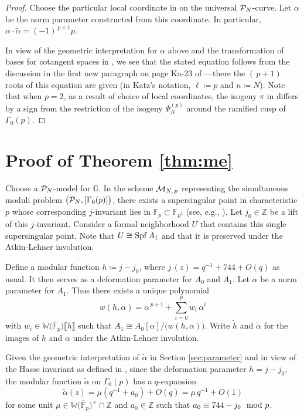 \documentclass{gtpart}
\theoremstyle{definition}
\theoremstyle{remark}
\newcommand{\mb}[1]{\mathbb{#1}}
\newcommand{\Spf}{{\rm Spf\thinspace}}
\newcommand{\cF}{\overline {\mb F}}
\newcommand{\CM}{{\cal M}}
\newcommand{\CP}{{\cal P}}
\newcommand{\BF}{{\mb F}}
\newcommand{\BG}{{\mb G}}
\newcommand{\BW}{{\mb W}}
\newcommand{\BZ}{{\mb Z}}
\newcommand{\tA}{\widetilde{\A}}
\renewcommand{\th}{\widetilde{h}}
\newcommand{\md}{~~{\rm mod}~}
\newcommand{\A}{\alpha}
\newcommand{\G}{\Gamma}
\newcommand{\ce}{\coloneqq}
\newcommand{\lb}{\llbracket}
\newcommand{\rb}{\rrbracket}
\renewcommand{\=}{\approx}
\renewcommand{\-}{\sim}
\numberwithin{equation}{section}
\begin{document}
\begin{proof}
 Choose the particular local coordinate in \cite[Theorem 4]{Ando95} on the 
 universal $\CP_N$-curve.  Let $\A$ be the norm parameter constructed from this 
 coordinate.  In particular, $\A \cdot \tA = (-1)^{\,p + 1} p$.  

 In view of the geometric interpretation for $\A$ above and the transformation 
 of bases for cotangent spaces in \cite[Remark 3.16]{ho}, we see that the stated 
 equation follows from the discussion in the first new paragraph on page Ka-23 
 of \cite{padicprop}---there the $(\,p + 1)$ roots of this equation are given 
 (in Katz's notation, $\ell \ce p$ and $n \ce N$).  Note that when $p = 2$, as a 
 result of choice of local coordinates, the isogeny $\pi$ in 
 \cite[Section 1.11]{padicprop} differs by a sign from the restriction of the 
 isogeny $\Psi_N^{(p)}$ around the ramified cusp of $\G_0(p)$.  
\end{proof}



\section{Proof of Theorem \ref{thm:me}}
\label{sec:pf}

Choose a $\CP_N$-model for $\BG$.  In the scheme $\CM_{N,\,p}$ representing the 
simultaneous moduli problem $\big(\CP_N,[\G_0(p)]\big)$, there exists a 
supersingular point in characteristic $p$ whose corresponding $j$-invariant lies 
in $\BF_p \subset \BF_{p^2}$ (see, e.g., 
\cite[Theorem 14.18 and Proposition 14.15]{Cox}).  Let $j_0 \in \BZ$ be a lift 
of this $j$-invariant.  Consider a formal neighborhood $U$ that contains this 
single supersingular point.  Note that $U \cong \Spf A_1$ and that it is 
preserved under the Atkin-Lehner involution.  

Define a modular function $h \ce j - j_0$, where $j\,(z) = q^{-1} + 744 + O(q)$ 
as usual.  It then serves as a deformation parameter for $A_0$ and $A_1$.  Let 
$\A$ be a norm parameter for $A_1$.  Thus there exists a unique polynomial 
\begin{equation}
 \label{w}
 w(h,\A) = \A^{\,p + 1} + \sum_{i = 0}^p w_i \, \A^i 
\end{equation}
with $w_i \in \BW\big(\cF_p\big)\lb h \rb$ such that 
$A_1 \cong A_0[\A] / \big(w(h,\A)\big)$.  Write $\th$ and $\tA$ for the images 
of $h$ and $\A$ under the Atkin-Lehner involution.  

Given the geometric interpretation of $\tA$ in Section \ref{sec:parameter} and 
in view of the Hasse invariant as defined in \cite[12.4.1]{KM}, since the 
deformation parameter $h = j - j_0$, the modular function $\tA$ on $\G_0(p)$ has 
a $q$-expansion 
\[
 \tA(z) = \mu (q^{-1} + a_0) + O(q) = \mu \, q^{-1} + O(1) 
\]
for some unit $\mu \in \BW\big(\cF_p\big)^{\!\times} \!\cap \BZ$ and 
$a_0 \in \BZ$ such that $a_0 \equiv 744 - j_0 \md p$.  
\end{document}
